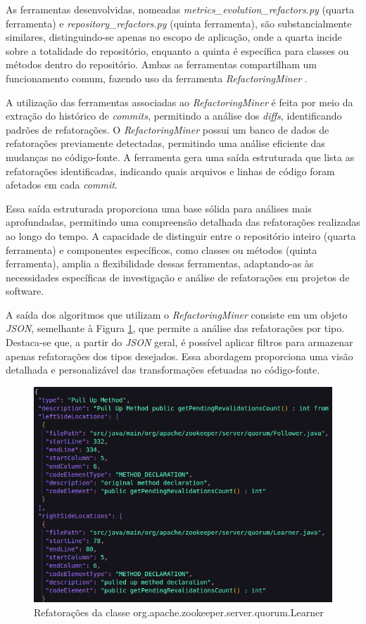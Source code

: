 As ferramentas desenvolvidas, nomeadas \textit{metrics\_evolution\_refactors.py} \cite{RefactoringMiner:RepositoryRefactors:2023} (quarta ferramenta) e \textit{repository\_refactors.py} \cite{RefactoringMiner:MetricsEvolution:2023} (quinta ferramenta),  são substancialmente similares, distinguindo-se apenas no escopo de aplicação, onde a quarta  incide sobre a totalidade do repositório, enquanto a quinta é específica para classes ou métodos dentro do repositório. Ambas as ferramentas compartilham um funcionamento comum, fazendo uso da ferramenta \textit{RefactoringMiner} \cite{Tsantalis:ICSE:2018:RefactoringMiner}.

A utilização das ferramentas associadas ao \textit{RefactoringMiner} é feita por meio da extração do histórico de \textit{commits}, permitindo a análise dos \textit{diffs}, identificando padrões de refatorações. O \textit{RefactoringMiner} possui um banco de dados de refatorações previamente detectadas, permitindo uma análise eficiente das mudanças no código-fonte. A ferramenta gera uma saída estruturada que lista as refatorações identificadas, indicando quais arquivos e linhas de código foram afetados em cada \textit{commit}.

Essa saída estruturada proporciona uma base sólida para análises mais aprofundadas, permitindo uma compreensão detalhada das refatorações realizadas ao longo do tempo. A capacidade de distinguir entre o repositório inteiro (quarta ferramenta) e componentes específicos, como classes ou métodos (quinta ferramenta), amplia a flexibilidade dessas ferramentas, adaptando-as às necessidades específicas de investigação e análise de refatorações em projetos de software.

A saída dos algoritmos que utilizam o \textit{RefactoringMiner} consiste em um objeto \textit{JSON}, semelhante à Figura \ref{fig:RefactoringMinerOutput}, que permite a análise das refatorações por tipo. Destaca-se que, a partir do \textit{JSON} geral, é possível aplicar filtros para armazenar apenas refatorações dos tipos desejados. Essa abordagem proporciona uma visão detalhada e personalizável das transformações efetuadas no código-fonte.

\begin{figure}[h]
    \centering
    \includegraphics[width=0.8\linewidth]{figuras/Output/RefactoringMiner/org.apache.zookeeper.server.quorum.Learner.png}
    \caption{Refatorações da classe org.apache.zookeeper.server.quorum.Learner}
    \label{fig:RefactoringMinerOutput}
\end{figure}

